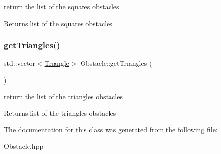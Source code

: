return the list of the squares obstacles \begin{DoxyReturn}{Returns}
list of the squares obstacles 
\end{DoxyReturn}
\mbox{\label{class_obstacle_a4b995e62a7aece596b2e42c63cdf5e28}} 
\subsubsection{\texorpdfstring{get\+Triangles()}{getTriangles()}}
{\footnotesize\ttfamily std\+::vector$<$\mbox{\hyperlink{class_triangle}{Triangle}}$>$ Obstacle\+::get\+Triangles (\begin{DoxyParamCaption}{ }\end{DoxyParamCaption})}

return the list of the triangles obstacles \begin{DoxyReturn}{Returns}
list of the triangles obstacles 
\end{DoxyReturn}


The documentation for this class was generated from the following file\+:\begin{DoxyCompactItemize}
\item 
Obstacle.\+hpp\end{DoxyCompactItemize}

